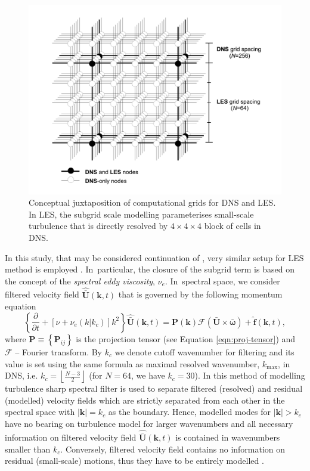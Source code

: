 \documentclass{pracamgren}
\begin{document}
\begin{figure}[h]
\centering
\includegraphics[width=17cm]{img/figs/dns-les-grids.pdf}
\caption{
Conceptual juxtaposition of computational grids for DNS and LES. In LES, the subgrid scale modelling parameterises small-scale turbulence that is directly resolved by $4 \times 4 \times 4$ block of cells in DNS.
}
\label{fig:dns-les-grids}
\end{figure}

In this study, that may be considered continuation of \textcite{Rosa2017}, very similar setup for LES method is employed \parencite[based on earlier work by ][]{Jin2010}.
In~particular, the closure of the subgrid term is based on the concept of the \emph{spectral eddy viscosity}, $\nu_{e}$.
In~spectral space, we consider filtered velocity field $\hat{\bar{\mathbf{U}}}(\mathbf{k}, t)$ that is governed by the following momentum equation \parencite{Pope2000}
\begin{equation}
\left\lbrace \frac{\partial}{\partial t} + [\nu + \nu_{e}(k|k_{c})]k^{2} \right\rbrace \hat{\bar{\mathbf{U}}}(\mathbf{k}, t) = \mathbf{P}(\mathbf{k}) \mathcal{F}(\bar{\mathbf{U}} \times \bar{\boldsymbol{\omega}}) + \hat{\mathbf{f}}(\mathbf{k}, t) ,
\label{eqn:les}
\end{equation}
where $\mathbf{P} \equiv \left\{ \mathbf{P}_{ij} \right\}$ is the projection tensor (see Equation \ref{eqn:proj-tensor}) and $\mathcal{F}$ -- Fourier transform.
By $k_{c}$ we denote cutoff wavenumber for filtering and its value is set using the same formula as maximal resolved wavenumber, $k_{\max}$, in DNS, i.e. $k_c = \left\lfloor \frac{N - 3}{2} \right\rfloor$ (for $N=64$, we have $k_c = 30$).
In this method of modelling turbulence sharp spectral filter is used to separate filtered (resolved) and residual (modelled) velocity fields which are strictly separated from each other in the spectral space with $| \mathbf{k} | = k_c$ as the boundary.
Hence, modelled modes for $| \mathbf{k} | > k_c$ have no bearing on turbulence model for larger wavenumbers and all necessary information on filtered velocity field $\mathbf{\hat{\bar{U}}}(\mathbf{k}, t)$ is contained in wavenumbers smaller than $k_c$.
Conversely, filtered velocity field contains no information on residual (small-scale) motions, thus they have to be entirely modelled \parencite[p. 615]{Pope2000}.
\end{document}
